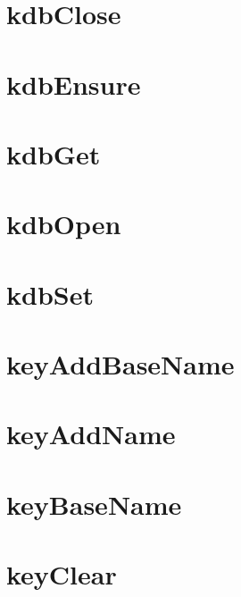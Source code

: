 \documentclass[twoside]{book}
\newcommand{\+}{\discretionary{\mbox{\scriptsize$\hookleftarrow$}}{}{}}
\begin{document}
\chapter{kdb\+Close}
\label{doc_api_review_core_kdbClose_md}

\chapter{kdb\+Ensure}
\label{doc_api_review_core_kdbEnsure_md}

\chapter{kdb\+Get}
\label{doc_api_review_core_kdbGet_md}

\chapter{kdb\+Open}
\label{doc_api_review_core_kdbOpen_md}

\chapter{kdb\+Set}
\label{doc_api_review_core_kdbSet_md}

\chapter{key\+Add\+Base\+Name}
\label{doc_api_review_core_keyAddBaseName_md}

\chapter{key\+Add\+Name}
\label{doc_api_review_core_keyAddName_md}

\chapter{key\+Base\+Name}
\label{doc_api_review_core_keyBaseName_md}

\chapter{key\+Clear}
\label{doc_api_review_core_keyClear_md}

\end{document}
